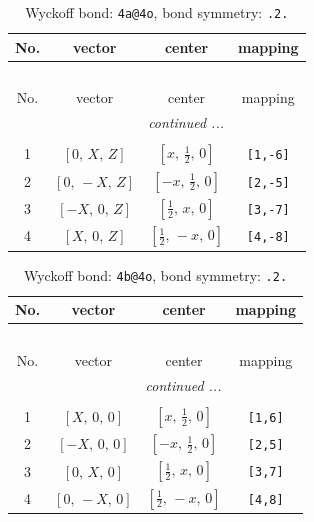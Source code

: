 \documentclass[fleqn,8pt]{jsarticle}
\begin{document}
\begin{longtable}{cccc}
\caption{Wyckoff bond: {\tt 4a@4o}, bond symmetry: {\tt .2.}}
 \\
 \hline \hline
No. & vector & center & mapping \\ \hline \endfirsthead

\multicolumn{3}{l}{\tablename\ \thetable{}} \\
 \hline \hline
No. & vector & center & mapping \\ \hline \endhead

 \hline \hline
\multicolumn{3}{r}{\footnotesize\it continued ...} \\ \endfoot

 \hline \hline
\multicolumn{3}{r}{} \\ \endlastfoot

1 & $\left[ 0,\, X,\, Z \right]$ & $\left[ x,\, \frac{1}{2},\, 0 \right]$ & {\tt [1,-6]} \\ \hline
2 & $\left[ 0,\, - X,\, Z \right]$ & $\left[ - x,\, \frac{1}{2},\, 0 \right]$ & {\tt [2,-5]} \\ \hline
3 & $\left[ - X,\, 0,\, Z \right]$ & $\left[ \frac{1}{2},\, x,\, 0 \right]$ & {\tt [3,-7]} \\ \hline
4 & $\left[ X,\, 0,\, Z \right]$ & $\left[ \frac{1}{2},\, - x,\, 0 \right]$ & {\tt [4,-8]} \\
\end{longtable}
\renewcommand{\arraystretch}{1.2}
\begin{longtable}{cccc}
\caption{Wyckoff bond: {\tt 4b@4o}, bond symmetry: {\tt .2.}}
 \\
 \hline \hline
No. & vector & center & mapping \\ \hline \endfirsthead

\multicolumn{3}{l}{\tablename\ \thetable{}} \\
 \hline \hline
No. & vector & center & mapping \\ \hline \endhead

 \hline \hline
\multicolumn{3}{r}{\footnotesize\it continued ...} \\ \endfoot

 \hline \hline
\multicolumn{3}{r}{} \\ \endlastfoot

1 & $\left[ X,\, 0,\, 0 \right]$ & $\left[ x,\, \frac{1}{2},\, 0 \right]$ & {\tt [1,6]} \\ \hline
2 & $\left[ - X,\, 0,\, 0 \right]$ & $\left[ - x,\, \frac{1}{2},\, 0 \right]$ & {\tt [2,5]} \\ \hline
3 & $\left[ 0,\, X,\, 0 \right]$ & $\left[ \frac{1}{2},\, x,\, 0 \right]$ & {\tt [3,7]} \\ \hline
4 & $\left[ 0,\, - X,\, 0 \right]$ & $\left[ \frac{1}{2},\, - x,\, 0 \right]$ & {\tt [4,8]} \\
\end{longtable}
\end{document}

